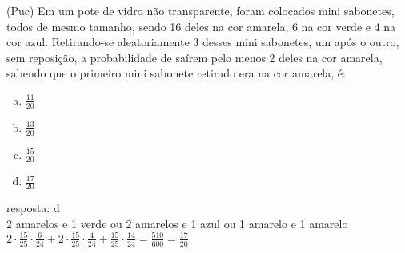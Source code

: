 \begin{ex}
  (Puc) Em um pote de vidro não transparente, foram colocados mini sabonetes, todos de mesmo tamanho, sendo 16 deles na cor amarela, 6 na cor verde e 4 na cor azul. Retirando-se aleatoriamente 3 desses mini sabonetes, um após o outro, sem reposição, a probabilidade de saírem pelo menos 2 deles na cor amarela, sabendo que o primeiro mini sabonete retirado era na cor amarela, é:
     \begin{enumerate} [(a)]
         \item $\frac{11}{20}$
         \item $\frac{13}{20}$
         \item $\frac{15}{20}$
         \item $\frac{17}{20}$
     \end{enumerate}
       \begin{sol}
        resposta: d \\
        2 amarelos e 1 verde ou 2 amarelos e 1 azul ou 1 amarelo e 1 amarelo\\
        $2\cdot\frac{15}{25}\cdot\frac{6}{24}+2\cdot\frac{15}{25}\cdot\frac{4}{24}+\frac{15}{25}\cdot\frac{14}{24}=\frac{510}{600}=\frac{17}{20}$
       \end{sol}
 \end{ex}